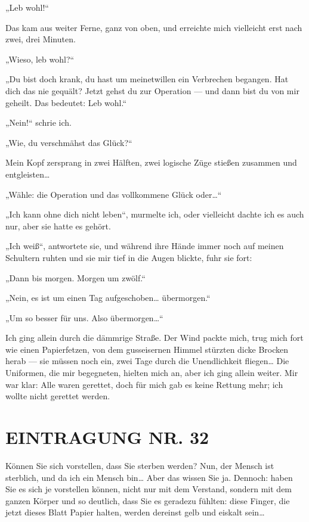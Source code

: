 „Leb wohl!“

Das kam aus weiter Ferne, ganz von oben, und erreichte mich
vielleicht erst nach zwei, drei Minuten.

„Wieso, leb wohl?“

„Du bist doch krank, du hast um meinetwillen ein Verbrechen
begangen. Hat dich das nie gequält? Jetzt gehst du zur Operation —
und dann bist du von mir geheilt. Das bedeutet: Leb wohl.“

„Nein!“ schrie ich.

„Wie, du verschmähst das Glück?“

Mein Kopf zersprang in zwei Hälften, zwei logische Züge stießen
zusammen und entgleisten\ldots{}

„Wähle: die Operation und das vollkommene Glück oder\ldots{}“

„Ich kann ohne dich nicht leben“, murmelte ich, oder vielleicht
dachte ich es auch nur, aber sie hatte es gehört.

„Ich weiß“, antwortete sie, und während ihre Hände immer noch auf meinen
Schultern ruhten und sie mir tief in die Augen blickte, fuhr sie
fort:

„Dann bis morgen. Morgen um zwölf.“

„Nein, es ist um einen Tag aufgeschoben\ldots{} übermorgen.“

„Um so besser für uns. Also übermorgen\ldots{}“

Ich ging allein durch
die dämmrige Straße. Der Wind packte mich, trug mich fort wie einen
Papierfetzen, von dem gusseisernen Himmel stürzten dicke Brocken
herab — sie müssen noch ein, zwei Tage durch die Unendlichkeit
fliegen\ldots{} Die Uniformen, die mir begegneten, hielten mich an, aber
ich ging allein weiter. Mir war klar: Alle waren gerettet, doch für
mich gab es keine Rettung mehr; ich wollte nicht gerettet werden.

\section{EINTRAGUNG NR. 32}

Können Sie sich vorstellen, dass Sie sterben werden? Nun, der
Mensch ist sterblich, und da ich ein Mensch bin\ldots{} Aber das wissen
Sie ja. Dennoch: haben Sie es sich je vorstellen können, nicht nur
mit dem Verstand, sondern mit dem ganzen Körper und so deutlich,
dass Sie es geradezu fühlten: diese Finger, die jetzt dieses Blatt
Papier halten, werden dereinst gelb und eiskalt sein\ldots{}

